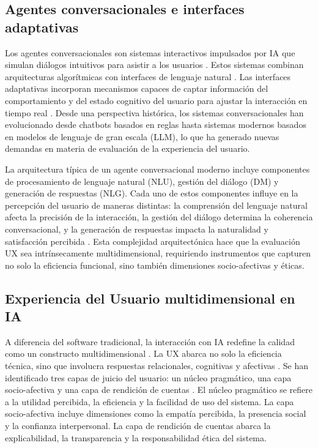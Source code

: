 \documentclass[11pt,twocolumn]{article}
\begin{document}
\subsection{Agentes conversacionales e interfaces adaptativas}

Los agentes conversacionales son sistemas interactivos impulsados por IA que simulan diálogos intuitivos para asistir a los usuarios \cite{folstad2021}. Estos sistemas combinan arquitecturas algorítmicas con interfaces de lenguaje natural \cite{belda2023}. Las interfaces adaptativas incorporan mecanismos capaces de captar información del comportamiento y del estado cognitivo del usuario para ajustar la interacción en tiempo real \cite{brdnik2022}. Desde una perspectiva histórica, los sistemas conversacionales han evolucionado desde chatbots basados en reglas hasta sistemas modernos basados en modelos de lenguaje de gran escala (LLM), lo que ha generado nuevas demandas en materia de evaluación de la experiencia del usuario.

La arquitectura típica de un agente conversacional moderno incluye componentes de procesamiento de lenguaje natural (NLU), gestión del diálogo (DM) y generación de respuestas (NLG). Cada uno de estos componentes influye en la percepción del usuario de maneras distintas: la comprensión del lenguaje natural afecta la precisión de la interacción, la gestión del diálogo determina la coherencia conversacional, y la generación de respuestas impacta la naturalidad y satisfacción percibida \cite{folstad2021}. Esta complejidad arquitectónica hace que la evaluación UX sea intrínsecamente multidimensional, requiriendo instrumentos que capturen no solo la eficiencia funcional, sino también dimensiones socio-afectivas y éticas.

\subsection{Experiencia del Usuario multidimensional en IA}

A diferencia del software tradicional, la interacción con IA redefine la calidad como un constructo multidimensional \cite{marconi2026}. La UX abarca no solo la eficiencia técnica, sino que involucra respuestas relacionales, cognitivas y afectivas \cite{borsci2021}. Se han identificado tres capas de juicio del usuario: un núcleo pragmático, una capa socio-afectiva y una capa de rendición de cuentas \cite{marconi2026}. El núcleo pragmático se refiere a la utilidad percibida, la eficiencia y la facilidad de uso del sistema. La capa socio-afectiva incluye dimensiones como la empatía percibida, la presencia social y la confianza interpersonal. La capa de rendición de cuentas abarca la explicabilidad, la transparencia y la responsabilidad ética del sistema.
\end{document}
